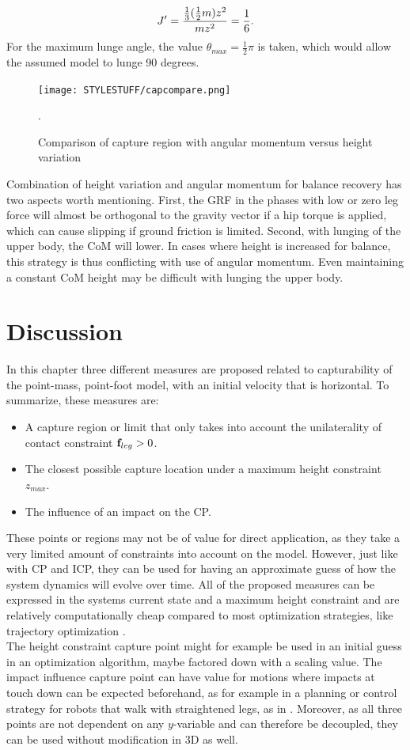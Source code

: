 \begin{equation}
	J' = \frac{\frac{1}{3}(\frac{1}{2}m)z^2}{mz^2} = \frac{1}{6}.
\end{equation}
For the maximum lunge angle, the value $\theta_{max} = \frac{1}{2}\pi$ is taken, which would allow the assumed model to lunge 90 degrees.
\begin{figure}[h]
\centering
\texttt{[image: STYLESTUFF/capcompare.png]}
\caption{Comparison of capture region with angular momentum versus height variation}.
\label{fig:capcompare}
\end{figure}
\paraskip
Combination of height variation and angular momentum for balance recovery has two aspects worth mentioning. First, the \ac{GRF} in the phases with low or zero leg force will almost be orthogonal to the gravity vector if a hip torque is applied, which can cause slipping if ground friction is limited. Second, with lunging of the upper body, the \ac{CoM} will lower. In cases where height is increased for balance, this strategy is thus conflicting with use of angular momentum. Even maintaining a constant \ac{CoM} height may be difficult with lunging the upper body.

\section{Discussion}
In this chapter three different measures are proposed related to capturability of the point-mass, point-foot model, with an initial velocity that is horizontal. To summarize, these measures are:
\begin{itemize}
	\item A capture region or limit that only takes into account the unilaterality of contact constraint $\mathbf{f}_{leg}>0$.
	\item The closest possible capture location under a maximum height constraint $z_{max}$.
	\item The influence of an impact on the \ac{CP}.
\end{itemize}
These points or regions may not be of value for direct application, as they take a very limited amount of constraints into account on the model. However, just like with \ac{CP} and \ac{ICP}, they can be used for having an approximate guess of how the system dynamics will evolve over time. All of the proposed measures can be expressed in the systems current state and a maximum height constraint and are relatively computationally cheap compared to most optimization strategies, like trajectory optimization \cite{kelly2017introduction}.\\
The height constraint capture point might for example be used in an initial guess in an optimization algorithm, maybe factored down with a scaling value. The impact influence capture point can have value for motions where impacts at touch down can be expected beforehand, as for example in a planning or control strategy for robots that walk with straightened legs, as in \cite{griffin2018straight}. Moreover, as all three points are not dependent on any $y$-variable and can therefore be decoupled, they can be used without modification in \ac{3D} as well.